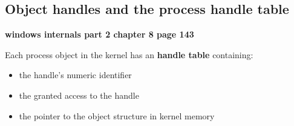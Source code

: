 \subsection{Object handles and the process handle table}

{\bf windows internals part 2 chapter 8 page 143}

Each process object in the kernel has an {\bf handle table} containing:
\begin{itemize}
    \item the handle's numeric identifier
    \item the granted access to the handle
    \item the pointer to the object structure in kernel memory
\end{itemize}

